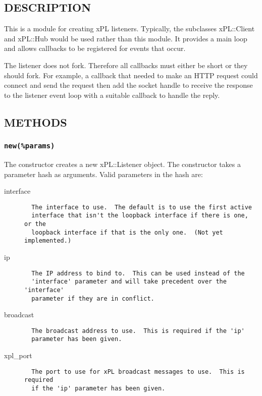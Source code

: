 \documentclass[12pt,a4paper]{article}
\begin{document}
\subsection*{DESCRIPTION\label{xPL::Listener_DESCRIPTION}}


This is a module for creating xPL listeners.  Typically, the
subclasses xPL::Client and xPL::Hub would be used rather than this
module.  It provides a main loop and allows callbacks to be registered
for events that occur.



The listener does not fork.  Therefore all callbacks must either be
short or they should fork.  For example, a callback that needed to
make an HTTP request could connect and send the request then add the
socket handle to receive the response to the listener event loop with a
suitable callback to handle the reply.

\subsection*{METHODS\label{xPL::Listener_METHODS}}
\subsubsection*{\texttt{new(\%params)}\label{xPL::Listener_new_params_}}


The constructor creates a new xPL::Listener object.  The constructor
takes a parameter hash as arguments.  Valid parameters in the hash
are:

\begin{description}

\item[{interface}] \mbox{}\begin{verbatim}
  The interface to use.  The default is to use the first active
  interface that isn't the loopback interface if there is one, or the
  loopback interface if that is the only one.  (Not yet implemented.)
\end{verbatim}

\item[{ip}] \mbox{}\begin{verbatim}
  The IP address to bind to.  This can be used instead of the
  'interface' parameter and will take precedent over the 'interface'
  parameter if they are in conflict.
\end{verbatim}

\item[{broadcast}] \mbox{}\begin{verbatim}
  The broadcast address to use.  This is required if the 'ip'
  parameter has been given.
\end{verbatim}

\item[{xpl\_port}] \mbox{}\begin{verbatim}
  The port to use for xPL broadcast messages to use.  This is required
  if the 'ip' parameter has been given.
\end{verbatim}
\end{description}
\end{document}

